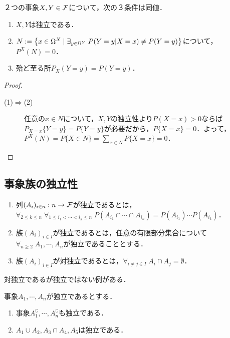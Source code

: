 \documentclass[uplatex,dvipdfmx]{jsreport}
\begin{document}
\begin{theorem}[独立性の特徴付け]
    ２つの事象$X,Y\in\mathcal{F}$について，次の３条件は同値．
    \begin{enumerate}
        \item $X,Y$は独立である．
        \item $N:=\left\{x\in\Omega^X\mid \exists_{y\in\Omega^Y}\;P(Y=y|X=x)\ne P(Y=y)\right\}$について，$P^X(N)=0$．
        \item 殆ど至る所$P_X(Y=y)=P(Y=y)$．
    \end{enumerate}
\end{theorem}
\begin{proof}\mbox{}
    \begin{description}
        \item[(1)$\Rightarrow$(2)] 任意の$x\in N$について，$X,Y$の独立性より$P(X=x)>0$ならば$P_{X=x}\{Y=y\}=P\{Y=y\}$が必要だから，$P\{X=x\}=0$．よって，$P^X(N)=P\{X\in N\}=\sum_{x\in N}P\{X=x\}=0$．
    \end{description}
\end{proof}

\subsection{事象族の独立性}

\begin{definition}\mbox{}
    \begin{enumerate}
        \item 列$(A_i)_{i\in n}:n\to\mathcal{F}$が独立であるとは，$\forall_{2\le k\le n}\;\forall_{1\le i_1<\cdots<i_k\le n}\;P(A_{i_1}\cap\cdots\cap A_{i_n})=P(A_{i_1})\cdots P(A_{i_k})$．
        \item 族$(A_i)_{i\in I}$が独立であるとは，任意の有限部分集合について$\forall_{n\ge 2}\;A_1,\cdots,A_nが独立$であることとする．
        \item 族$(A_i)_{i\in I}$が対独立であるとは，$\forall_{i\ne j\in I}\;A_i\cap A_j=\emptyset$．
    \end{enumerate}
\end{definition}

\begin{example}
    対独立であるが独立ではない例がある．
\end{example}

\begin{lemma}[独立性の遺伝]
    事象$A_1,\cdots,A_n$が独立であるとする．
    \begin{enumerate}
        \item 事象$A_1^\complement,\cdots,A_n^\complement$も独立である．
        \item $A_1\cup A_2, A_3\cap A_4,A_5$は独立である．
    \end{enumerate}
\end{lemma}
\end{document}
